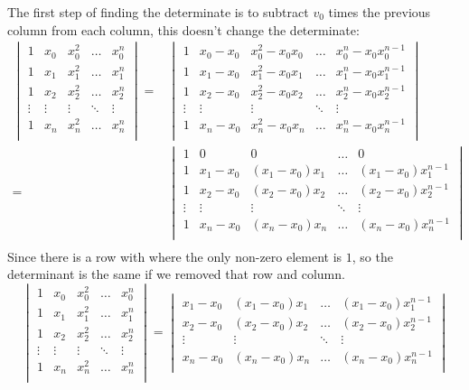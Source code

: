 The first step of finding the determinate is to subtract $v_0$ times the previous column from each column,
this doesn't change the determinate:
\begin{equation*}
\begin{aligned}
\begin{vmatrix} 
	1&x_0&x_0^2&\dots&x_0^n \\
	1&x_1&x_1^2&\dots&x_1^n \\
	1&x_2&x_2^2&\dots&x_2^n \\
	\vdots&\vdots&\vdots&\ddots&\vdots \\
	1&x_n&x_n^2&\dots&x_n^n \\
\end{vmatrix} =&
\begin{vmatrix} 
	1&x_0-x_0&x_0^2-x_0x_0&\dots&x_0^n-x_0x_0^{n-1} \\
	1&x_1-x_0&x_1^2-x_0x_1&\dots&x_1^n-x_0x_1^{n-1}\\
	1&x_2-x_0&x_2^2-x_0x_2&\dots&x_2^n-x_0x_2^{n-1} \\
	\vdots&\vdots&\vdots&\ddots&\vdots \\
	1&x_n-x_0&x_n^2-x_0x_n&\dots&x_n^n-x_0x_n^{n-1} \\
\end{vmatrix} \\
=&
\begin{vmatrix} 
	1&0&0&\dots&0 \\
	1&x_1-x_0&(x_1-x_0)x_1&\dots&(x_1-x_0)x_1^{n-1}\\
	1&x_2-x_0&(x_2-x_0)x_2&\dots&(x_2-x_0)x_2^{n-1} \\
	\vdots&\vdots&\vdots&\ddots&\vdots \\
	1&x_n-x_0&(x_n-x_0)x_n&\dots&(x_n-x_0)x_n^{n-1} \\
\end{vmatrix} \\
\end{aligned}
\end{equation*}
Since there is a row with where the only non-zero element is $1$,
so the determinant is the same if we removed that row and column.
\[
\begin{vmatrix} 
	1&x_0&x_0^2&\dots&x_0^n \\
	1&x_1&x_1^2&\dots&x_1^n \\
	1&x_2&x_2^2&\dots&x_2^n \\
	\vdots&\vdots&\vdots&\ddots&\vdots \\
	1&x_n&x_n^2&\dots&x_n^n \\
\end{vmatrix}  
=
\begin{vmatrix} 
	x_1-x_0&(x_1-x_0)x_1&\dots&(x_1-x_0)x_1^{n-1}\\
	x_2-x_0&(x_2-x_0)x_2&\dots&(x_2-x_0)x_2^{n-1} \\
	\vdots&\vdots&\ddots&\vdots \\
	x_n-x_0&(x_n-x_0)x_n&\dots&(x_n-x_0)x_n^{n-1} \\
\end{vmatrix} 
\]

